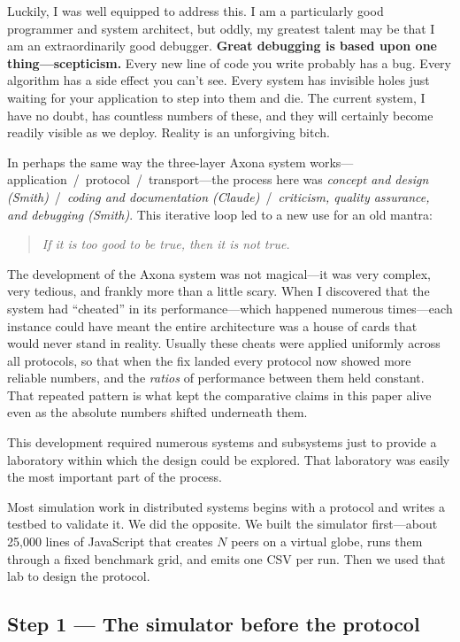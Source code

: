 \documentclass[nobib]{tufte-handout}
\begin{document}
Luckily, I was well equipped to address this. I am a particularly good programmer and system architect, but oddly, my greatest talent may be that I am an extraordinarily good debugger. \textbf{Great debugging is based upon one thing---scepticism.} Every new line of code you write probably has a bug. Every algorithm has a side effect you can't see. Every system has invisible holes just waiting for your application to step into them and die. The current system, I have no doubt, has countless numbers of these, and they will certainly become readily visible as we deploy. Reality is an unforgiving bitch.

In perhaps the same way the three-layer Axona system works---application~/~protocol~/~transport---the process here was \emph{concept and design (Smith)}~/~\emph{coding and documentation (Claude)}~/~\emph{criticism, quality assurance, and debugging (Smith)}. This iterative loop led to a new use for an old mantra:

\begin{quote}
\centering\itshape
If it is too good to be true, then it is not true.
\end{quote}

The development of the Axona system was not magical---it was very complex, very tedious, and frankly more than a little scary. When I discovered that the system had ``cheated'' in its performance---which happened numerous times---each instance could have meant the entire architecture was a house of cards that would never stand in reality. Usually these cheats were applied uniformly across all protocols, so that when the fix landed every protocol now showed more reliable numbers, and the \emph{ratios} of performance between them held constant. That repeated pattern is what kept the comparative claims in this paper alive even as the absolute numbers shifted underneath them.

This development required numerous systems and subsystems just to provide a laboratory within which the design could be explored. That laboratory was easily the most important part of the process.

Most simulation work in distributed systems begins with a protocol and writes a testbed to validate it. We did the opposite. We built the simulator first---about 25{,}000 lines of JavaScript that creates $N$ peers on a virtual globe, runs them through a fixed benchmark grid, and emits one CSV per run. Then we used that lab to design the protocol.

\subsection*{Step 1 --- The simulator before the protocol}
\end{document}
